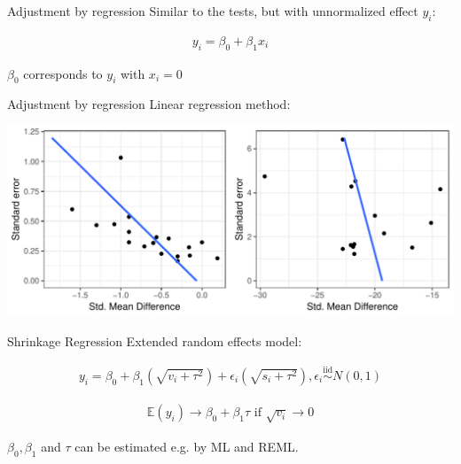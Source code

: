 \documentclass[english]{beamer}\usepackage[]{graphicx}\usepackage[]{color}
\makeatletter
\def\maxwidth{ %
  \ifdim\Gin@nat@width>\linewidth
    \linewidth
  \else
    \Gin@nat@width
  \fi
}
\newenvironment{knitrout}{}{} %
\makeatother
\begin{document}
\begin{frame}{Adjustment by regression}
Similar to the tests, but with unnormalized effect $y_{i}$:

\begin{align}
y_{i} = \beta_{0} + \beta_{1}x_{i}
\end{align}

$\beta_{0}$	 corresponds to $y_{i}$ with $x_{i} = 0$
\end{frame}

\begin{frame}[fragile]{Adjustment by regression}
Linear regression method:

\begin{knitrout}
\color{fgcolor}
\includegraphics[width=\maxwidth]{figure/unnamed-chunk-13-1} 

\end{knitrout}
\end{frame}

\begin{frame}[fragile]{Shrinkage Regression}
Extended random effects model:

\vspace{-4mm}
\begin{align}
y_{i} = \beta_{0} + \beta_{1}(\sqrt{v_{i} + \tau^2}) + \epsilon_{i}(\sqrt{s_{i} + \tau^2}),  
\epsilon_{i} \stackrel{\textrm{iid}}{\sim} N(0,1) \nonumber
\end{align}

\vspace{-8mm}
\begin{align}
\mathbb{E}(y_{i}) \rightarrow \beta_{0} + \beta_{1}\tau \textrm{ if } \sqrt{v_{i}} \rightarrow 0 \nonumber
\end{align}

$\beta_{0}, \beta_{1}$ and $\tau$ can be estimated e.g. by ML and REML.
\end{frame}
\end{document}
